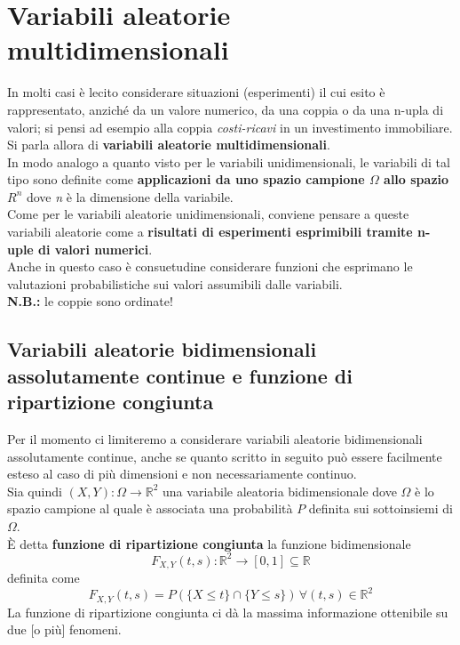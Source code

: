 \section{Variabili aleatorie multidimensionali}
In molti casi è lecito considerare situazioni (esperimenti) il cui esito è rappresentato, anziché da un valore numerico, da una coppia o da una n-upla di valori; si pensi ad esempio alla coppia \textit{costi-ricavi }in un investimento immobiliare. Si parla allora di \textbf{variabili aleatorie multidimensionali}.\\
In modo analogo a quanto visto per le variabili unidimensionali, le variabili di tal tipo sono definite come \textbf{applicazioni da uno spazio campione $\Omega$ allo spazio $R^n$} dove \textit{n} è la dimensione della variabile.\\
Come per le variabili aleatorie unidimensionali, conviene pensare a queste variabili aleatorie come a \textbf{risultati di esperimenti esprimibili tramite n-uple di valori numerici}. \\
Anche in questo caso è consuetudine considerare funzioni che esprimano le valutazioni probabilistiche sui valori assumibili dalle variabili. \\
\textbf{N.B.:} le coppie sono ordinate!

\subsection{Variabili aleatorie bidimensionali assolutamente continue e funzione di ripartizione congiunta}
Per il momento ci limiteremo a considerare variabili aleatorie bidimensionali assolutamente continue, anche se quanto scritto in seguito può essere facilmente esteso al caso di più dimensioni e non necessariamente continuo. \\
Sia quindi $(X, Y): \Omega \rightarrow \mathbb{R}^2$ una variabile aleatoria bidimensionale dove $\Omega$ è lo spazio campione al quale è associata una probabilità $P$ definita sui sottoinsiemi di $\Omega$. \\
È detta \textbf{funzione di ripartizione congiunta} la funzione bidimensionale
\begin{equation}
F_{X, Y}(t, s): \mathbb{R}^2 \rightarrow [0, 1] \subseteq \mathbb{R}
\end{equation}
definita come
\begin{equation}
	F_{X, Y}(t, s) = P(\{X \leq t\} \cap \{Y \leq s\}) \, \forall (t, s) \in \mathbb{R}^2
\end{equation}
La funzione di ripartizione congiunta ci dà la massima informazione ottenibile su due [o più] fenomeni.

